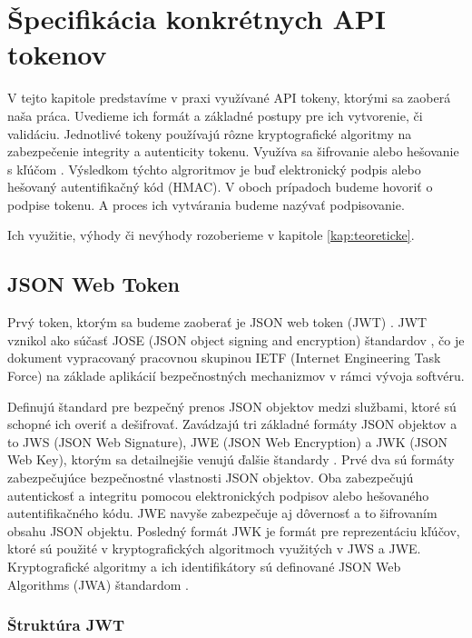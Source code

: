 \chapter{Špecifikácia konkrétnych API tokenov}

\label{kap:typy} %

V tejto kapitole predstavíme v praxi využívané API tokeny, ktorými sa zaoberá naša práca. Uvedieme ich formát a základné postupy pre ich vytvorenie, či validáciu. Jednotlivé tokeny používajú rôzne kryptografické algoritmy na zabezpečenie integrity a autenticity tokenu. Využíva sa šifrovanie alebo hešovanie s kľúčom \cite{hmac_povodny}. Výsledkom týchto algroritmov je buď elektronický podpis alebo hešovaný autentifikačný kód (HMAC). V oboch prípadoch budeme hovoriť o podpise tokenu. A proces ich vytvárania budeme nazývať podpisovanie.

Ich využitie, výhody či nevýhody rozoberieme v kapitole \ref{kap:teoreticke}.


\section{JSON Web Token}

Prvý token, ktorým sa budeme zaoberať je JSON web token (JWT) \cite{jwt_rfc}. JWT vznikol ako súčasť JOSE (JSON object signing and encryption) štandardov \cite{jose_rfc}, čo je dokument vypracovaný pracovnou skupinou IETF (Internet Engineering Task Force) na základe aplikácií bezpečnostných mechanizmov v rámci vývoja softvéru.

Definujú štandard pre bezpečný prenos JSON objektov medzi službami, ktoré sú schopné ich overiť a dešifrovať. Zavádzajú tri základné formáty JSON objektov a to JWS (JSON Web Signature), JWE (JSON Web Encryption) a JWK (JSON Web Key), ktorým sa detailnejšie venujú ďalšie štandardy \cite{jws_rfc, jwe_rfc, jwk_rfc}. Prvé dva sú formáty zabezpečujúce bezpečnostné vlastnosti JSON objektov. Oba zabezpečujú autentickosť a integritu pomocou elektronických podpisov alebo hešovaného autentifikačného kódu. JWE navyše zabezpečuje aj dôvernosť a to šifrovaním obsahu JSON objektu. Posledný formát JWK je formát pre reprezentáciu kľúčov, ktoré sú použité v kryptografických algoritmoch využitých v JWS a JWE. Kryptografické algoritmy a ich identifikátory sú definované JSON Web Algorithms (JWA) štandardom \cite{jwa_rfc}.


\subsection{Štruktúra JWT}

